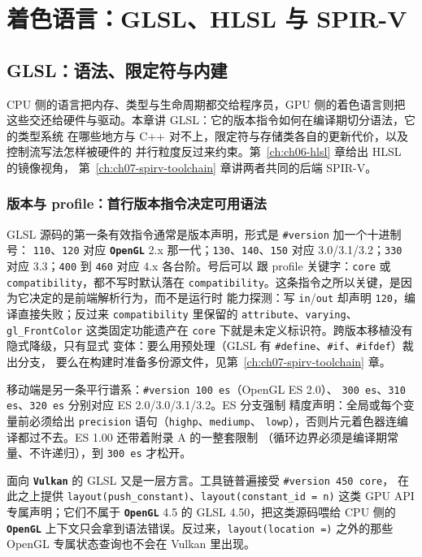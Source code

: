 \documentclass[12pt,a4paper,fontset=fandol]{ctexbook}
\newcommand{\Tp}[1]{\texttt{#1}}
\newcommand{\Bk}{\discretionary{}{}{}}
\newcommand{\Lib}[1]{\textbf{\texttt{#1}}}
\newcommand{\Lang}[1]{\textsf{#1}}
\newcommand{\CPP}{\Lang{C++}}
\newcommand{\DomCPU}{\Lang{CPU}}
\newcommand{\DomGPU}{\Lang{GPU}}
\newcommand{\GSL}{\Lang{GLSL}}
\newcommand{\HSL}{\Lang{HLSL}}
\newcommand{\SPIV}{\Lang{SPIR-V}}
\begin{document}
\part{着色语言：GLSL、HLSL 与 SPIR-V}
\chapter{GLSL：语法、限定符与内建}
\label{ch:ch05-glsl}

\DomCPU{} 侧的语言把内存、类型与生命周期都交给程序员，\DomGPU{} 侧的着色语言则把
这些交还给硬件与驱动。本章讲 \GSL{}：它的版本指令如何在编译期切分语法，它的类型系统
在哪些地方与 \CPP{} 对不上，限定符与存储类各自的更新代价，以及控制流写法怎样被硬件的
并行粒度反过来约束。第~\ref{ch:ch06-hlsl} 章给出 \HSL{} 的镜像视角，
第~\ref{ch:ch07-spirv-toolchain} 章讲两者共同的后端 \SPIV{}。

\section{版本与 profile：首行版本指令决定可用语法}

\GSL{} 源码的第一条有效指令通常是版本声明，形式是 \Tp{\#version} 加一个十进制号：
\Tp{110}、\Tp{120} 对应 \Lib{OpenGL} 2.x 那一代；\Tp{130}、\Tp{140}、\Tp{150}
对应 3.0/3.1/3.2；\Tp{330} 对应 3.3；\Tp{400} 到 \Tp{460} 对应 4.x 各台阶。号后可以
跟 profile 关键字：\Tp{core} 或 \Tp{compatibility}，都不写时默认落在
\Tp{compatibility}。这条指令之所以关键，是因为它决定的是前端解析行为，而不是运行时
能力探测：写 \Tp{in}/{\Bk}\Tp{out} 却声明 \Tp{120}，编译直接失败；反过来
\Tp{compatibility} 里保留的 \Tp{attribute}、\Tp{varying}、\Tp{gl\_FrontColor}
这类固定功能遗产在 \Tp{core} 下就是未定义标识符。跨版本移植没有隐式降级，只有显式
变体：要么用预处理（\GSL{} 有 \Tp{\#define}、\Tp{\#if}、\Tp{\#ifdef}）裁出分支，
要么在构建时准备多份源文件，见第~\ref{ch:ch07-spirv-toolchain} 章。

移动端是另一条平行谱系：\Tp{\#version 100 es}（\Lang{OpenGL ES} 2.0）、
\Tp{300 es}、\Tp{310 es}、\Tp{320 es} 分别对应 ES 2.0/3.0/3.1/3.2。ES 分支强制
精度声明：全局或每个变量前必须给出 \Tp{precision} 语句（\Tp{highp}、\Tp{mediump}、
\Tp{lowp}），否则片元着色器连编译都过不去。ES 1.00 还带着附录 A 的一整套限制
（循环边界必须是编译期常量、不许递归），到 \Tp{300 es} 才松开。

面向 \Lib{Vulkan} 的 \GSL{} 又是一层方言。工具链普遍接受 \Tp{\#version 450 core}，
在此之上提供 \Tp{layout(push\_constant)}、\Tp{layout(constant\_id = n)} 这类
\DomGPU{} API 专属声明；它们不属于 \Lib{OpenGL} 4.5 的 \GSL{} 4.50，把这类源码喂给
\DomCPU{} 侧的 \Lib{OpenGL} 上下文只会拿到语法错误。反过来，\Tp{layout(location =)}
之外的那些 OpenGL 专属状态查询也不会在 Vulkan 里出现。
\end{document}
